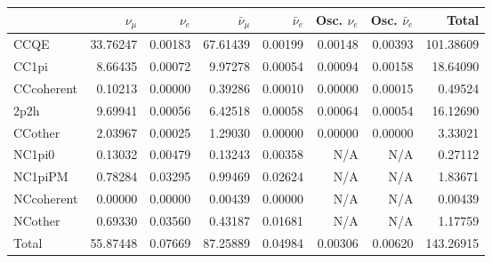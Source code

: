 \begin{tabular} { | l ||r | r | r | r | r | r | | r | }
\hline
              & $\nu_\mu$            & $\nu_e$              & $\bar{\nu}_{\mu}$    & $\bar{\nu}_{e}$      & Osc. $\nu_e$         & Osc. $\bar{\nu}_{e}$ & Total                \\ \hline\hline
 CCQE         & 33.76247             & 0.00183              & 67.61439             & 0.00199              & 0.00148              & 0.00393              & 101.38609            \\ \hline
 CC1pi        & 8.66435              & 0.00072              & 9.97278              & 0.00054              & 0.00094              & 0.00158              & 18.64090             \\ \hline
 CCcoherent   & 0.10213              & 0.00000              & 0.39286              & 0.00010              & 0.00000              & 0.00015              & 0.49524              \\ \hline
 2p2h         & 9.69941              & 0.00056              & 6.42518              & 0.00058              & 0.00064              & 0.00054              & 16.12690             \\ \hline
 CCother      & 2.03967              & 0.00025              & 1.29030              & 0.00000              & 0.00000              & 0.00000              & 3.33021              \\ \hline
 NC1pi0       & 0.13032              & 0.00479              & 0.13243              & 0.00358              & N/A                  & N/A                  & 0.27112              \\ \hline
 NC1piPM      & 0.78284              & 0.03295              & 0.99469              & 0.02624              & N/A                  & N/A                  & 1.83671              \\ \hline
 NCcoherent   & 0.00000              & 0.00000              & 0.00439              & 0.00000              & N/A                  & N/A                  & 0.00439              \\ \hline
 NCother      & 0.69330              & 0.03560              & 0.43187              & 0.01681              & N/A                  & N/A                  & 1.17759              \\ \hline
\hline
 Total        & 55.87448             & 0.07669              & 87.25889             & 0.04984              & 0.00306              & 0.00620              & 143.26915            \\ \hline

\end{tabular}
